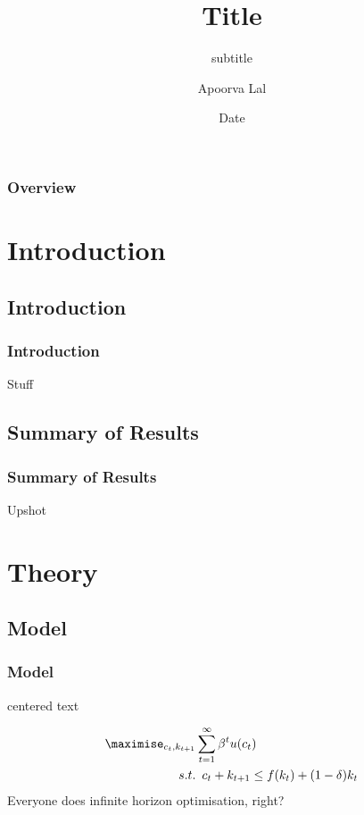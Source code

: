 \documentclass[11pt, aspectratio=169]{beamer}
\title{Title}
\subtitle{subtitle}
\author{Apoorva Lal}
\institute{Stanford}
\date{Date}
\begin{document}
\frame{\titlepage}
\begin{frame}
\frametitle{Overview}
\tableofcontents
\end{frame}
\section{Introduction}
\tableofcontents[currentsection,subsubsectionstyle=hide]
\subsection{Introduction}
\begin{frame}\frametitle{Introduction}
Stuff
\cite{AngristMostlyharmlesseconometrics2008b}
\end{frame}
\subsection{Summary of Results}
\begin{frame}[t]\frametitle{Summary of Results}
Upshot
\end{frame}

\section{Theory}
\tableofcontents[currentsection,subsubsectionstyle=hide]
\subsection{Model}
\begin{frame}[t]\frametitle{Model}
\begin{center}
centered text
\end{center}
\begin{align*}
\maximise_{c_t,k_{t+1}} &  \sum_{t=1}^{\infty} \beta^t u(c_t)  \\
  s.t. & \enspace c_{t} + k_{t+1} \leq f(k_t) + (1-\delta)k_t
\end{align*}
Everyone does infinite horizon optimisation, right?
\end{frame}
\end{document}
